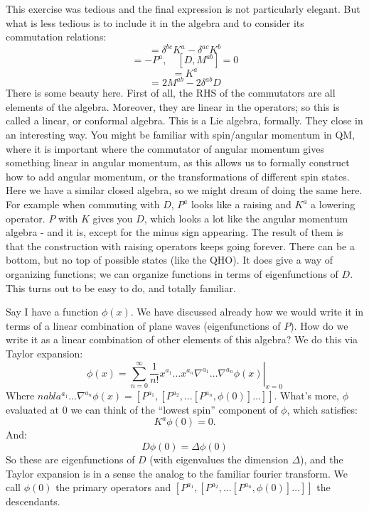 This exercise was tedious and the final expression is not particularly elegant. But what is less tedious is to include it in the algebra and to consider its commutation relations:
\begin{equation}
    [M^{ab}, K^a] = \delta^{bc}K^a - \delta^{ac}K^b
\end{equation}
\begin{equation}
    [D, P^a] = -P^a, \quad [D, M^{ab}] = 0
\end{equation}
\begin{equation}
    [D, K^a] = K^a
\end{equation}
\begin{equation}
    [P^a, K^b] = 2M^{ab} - 2\delta^{ab}D
\end{equation}
There is some beauty here. First of all, the RHS of the commutators are all elements of the algebra. Moreover, they are linear in the operators; so this is called a linear, or conformal algebra. This is a Lie algebra, formally. They close in an interesting way. You might be familiar with spin/angular momentum in QM, where it is important where the commutator of angular momentum gives something linear in angular momentum, as this allows us to formally construct how to add angular momentum, or the transformations of different spin states. Here we have a similar closed algebra, so we might dream of doing the same here. For example when commuting with $D$, $P^a$ looks like a raising and $K^a$ a lowering operator. $P$ with $K$ gives you $D$, which looks a lot like the angular momentum algebra - and it is, except for the minus sign appearing. The result of them is that the construction with raising operators keeps going forever. There can be a bottom, but no top of possible states (like the QHO). It does give a way of organizing functions; we can organize functions in terms of eigenfunctions of $D$. This turns out to be easy to do, and totally familiar. 

Say I have a function $\phi(x)$. We have discussed already how we would write it in terms of a linear combination of plane waves (eigenfunctions of $P$). How do we write it as a linear combination of other elements of this algebra? We do this via Taylor expansion:
\begin{equation}
    \phi(x) = \sum_{n=0}^\infty \left.\frac{1}{n!}x^{a_1}\ldots x^{a_n}\nabla^{a_1}\ldots \nabla^{a_n}\phi(x)\right|_{x=0}
\end{equation}
Where $nabla^{a_1}\ldots \nabla^{a_n}\phi(x) = [P^{a_1}, [P^{a_2}, \ldots [P^{a_n}, \phi(0)]\ldots]]$. What's more, $\phi$ evaluated at $0$ we can think of the ``lowest spin'' component of $\phi$, which satisfies:
\begin{equation}
    K^a\phi(0) = 0.
\end{equation}
And:
\begin{equation}
    D\phi(0) = \Delta\phi(0)
\end{equation}
So these are eigenfunctions of $D$ (with eigenvalues the dimension $\Delta$), and the Taylor expansion is in a sense the analog to the familiar fourier transform. We call $\phi(0)$ the primary operators and $[P^{a_1}, [P^{a_2}, \ldots [P^{a_n}, \phi(0)]\ldots]]$ the descendants.


